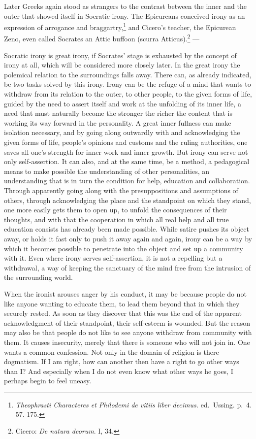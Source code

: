 \documentclass[12pt]{book}
\newcommand{\opage}[1]{\marginnote{\footnotesize\textit{[#1]}}}
\begin{document}
Later Greeks again stood as strangers to the contrast between the inner and the outer
that showed itself in Socratic irony. The Epicureans conceived irony as an expression
of arrogance and braggartry,\footnote{\textit{Theophrasti Characteres et Philodemi
de vitiis liber decimus.} ed.\ Ussing. p.~4. 57. 175.} and Cicero's teacher, the
Epicurean Zeno, even called Socrates an Attic buffoon (scurra
Atticus).\footnote{Cicero: \textit{De natura deorum}. I, 34.} ---

Socratic irony is great irony, if Socrates' stage is exhausted by the concept of
irony at all, which will be considered more closely later. In the great irony the
polemical relation to the surroundings falls away. There can, as already indicated,
be two tasks solved by this irony. Irony can be the refuge of \opage{63}a mind that
wants to withdraw from its relation to the outer, to other people, to the given
forms of life, guided by the need to assert itself and work at the unfolding of its
inner life, a need that must naturally become the stronger the richer the content
that is working its way forward in the personality. A great inner fullness can make
isolation necessary, and by going along outwardly with and acknowledging the given
forms of life, people's opinions and customs and the ruling authorities, one saves
all one's strength for inner work and inner growth. But irony can serve not only
self-assertion. It can also, and at the same time, be a method, a pedagogical means
to make possible the understanding of other personalities, an understanding that is
in turn the condition for help, education and collaboration. Through apparently
going along with the presuppositions and assumptions of others, through
acknowledging the place and the standpoint on which they stand, one more easily gets
them to open up, to unfold the consequences of their thoughts, and with that the
cooperation in which all real help and all true education consists has already been
made possible. While satire pushes its object away, or holds it fast only to push it
away again and again, irony can be a way by which it becomes possible to penetrate
into the object and set up a community with it. Even where irony serves
self-assertion, it is not a repelling but a withdrawal, a way of keeping the
sanctuary of the mind free from the intrusion of the surrounding world.

When the ironist arouses anger by his conduct, it may be because people do not like
anyone wanting to educate them, to lead them beyond that in which they securely
rested. As soon as they discover that this was the end of the apparent acknowledgment
of their standpoint, their self-esteem is wounded. But the reason may also be that
people do not like to see anyone withdraw from community with them. It causes
insecurity, merely that there is someone who will not join in. One wants a common
confession. Not only in the domain of religion is there dogmatism. If I am right,
how can another then have a right to go other ways than I? And especially when I do
not even know what other ways he goes, I perhaps begin to feel uneasy.
\end{document}
